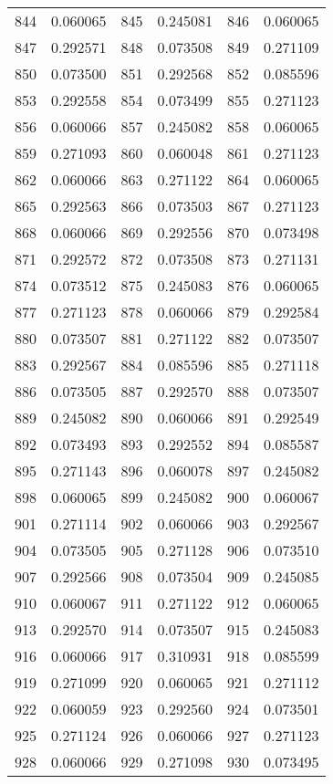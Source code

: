 \documentclass[12pt]{article}
\begin{document}
\begin{longtable}{@{}cc|cc|cc@{}}
844 & 0.060065 & 845 & 0.245081 & 846 & 0.060065 \\
847 & 0.292571 & 848 & 0.073508 & 849 & 0.271109 \\
850 & 0.073500 & 851 & 0.292568 & 852 & 0.085596 \\
853 & 0.292558 & 854 & 0.073499 & 855 & 0.271123 \\
856 & 0.060066 & 857 & 0.245082 & 858 & 0.060065 \\
859 & 0.271093 & 860 & 0.060048 & 861 & 0.271123 \\
862 & 0.060066 & 863 & 0.271122 & 864 & 0.060065 \\
865 & 0.292563 & 866 & 0.073503 & 867 & 0.271123 \\
868 & 0.060066 & 869 & 0.292556 & 870 & 0.073498 \\
871 & 0.292572 & 872 & 0.073508 & 873 & 0.271131 \\
874 & 0.073512 & 875 & 0.245083 & 876 & 0.060065 \\
877 & 0.271123 & 878 & 0.060066 & 879 & 0.292584 \\
880 & 0.073507 & 881 & 0.271122 & 882 & 0.073507 \\
883 & 0.292567 & 884 & 0.085596 & 885 & 0.271118 \\
886 & 0.073505 & 887 & 0.292570 & 888 & 0.073507 \\
889 & 0.245082 & 890 & 0.060066 & 891 & 0.292549 \\
892 & 0.073493 & 893 & 0.292552 & 894 & 0.085587 \\
895 & 0.271143 & 896 & 0.060078 & 897 & 0.245082 \\
898 & 0.060065 & 899 & 0.245082 & 900 & 0.060067 \\
901 & 0.271114 & 902 & 0.060066 & 903 & 0.292567 \\
904 & 0.073505 & 905 & 0.271128 & 906 & 0.073510 \\
907 & 0.292566 & 908 & 0.073504 & 909 & 0.245085 \\
910 & 0.060067 & 911 & 0.271122 & 912 & 0.060065 \\
913 & 0.292570 & 914 & 0.073507 & 915 & 0.245083 \\
916 & 0.060066 & 917 & 0.310931 & 918 & 0.085599 \\
919 & 0.271099 & 920 & 0.060065 & 921 & 0.271112 \\
922 & 0.060059 & 923 & 0.292560 & 924 & 0.073501 \\
925 & 0.271124 & 926 & 0.060066 & 927 & 0.271123 \\
928 & 0.060066 & 929 & 0.271098 & 930 & 0.073495 \\

\end{longtable}
\end{document}
